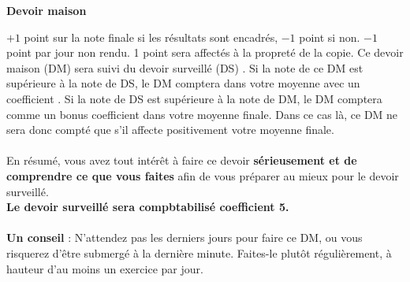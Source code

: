\documentclass[12pt,
addpoints,
fleqn
]{exam}
\begin{document}
\begin{center}
  {\huge\bfseries Devoir maison }
  \par\bigskip
\end{center}

 $+1$ point sur la note finale si les résultats sont encadrés, $-1$ point si non. $-1$ point par jour non rendu. 1 point sera affectés à la propreté de la copie.
Ce devoir maison (DM) sera suivi du devoir surveillé (DS) . Si la note de ce DM est supérieure à la note de DS, le DM comptera dans votre moyenne avec un coefficient . Si la note de DS est supérieure à la note de DM, le DM comptera comme un bonus coefficient  dans votre moyenne finale. Dans ce cas là, ce DM ne sera donc compté que s'il affecte positivement votre moyenne finale. \\ \\
En résumé, vous avez tout intérêt à faire ce devoir \textbf{sérieusement et de comprendre ce que vous faites} afin de vous préparer au mieux pour le devoir surveillé.\\
\textbf{Le devoir surveillé sera compbtabilisé coefficient 5.} \\ \\
\textbf{Un conseil} : N'attendez pas les derniers jours pour faire ce DM, ou vous risquerez d'être submergé à la dernière minute. Faites-le plutôt régulièrement, à hauteur d'au moins un exercice par jour. \\
\end{document}
